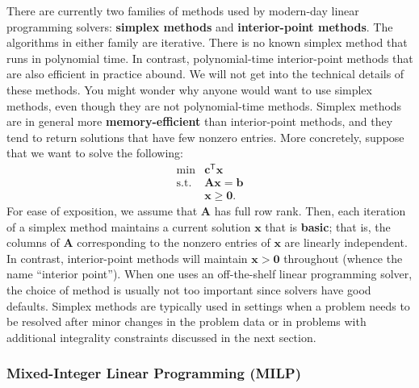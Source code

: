 There are currently two families of methods used by modern-day linear
programming solvers: \textbf{simplex methods} and \textbf{interior-point methods}. The
algorithms in either family are iterative. There is no known simplex
method that runs in polynomial time. In contrast, polynomial-time
interior-point methods that are also efficient in practice abound. We will not get into the technical details of these methods. \newl You might wonder why anyone would want to use simplex methods, even though they are not polynomial-time methods. Simplex methods are in general more \textbf{memory-efficient} than interior-point methods, and they tend to return solutions that have few nonzero entries. More
concretely, suppose that we want to solve the following:
\[\begin{array}{rl}
\min & \mathbf{c}^\mathsf{T}\mathbf{x} \\
\mbox{s.t.} & \mathbf{A}\mathbf{x} = \mathbf{b} \\
            & \mathbf{x} \geq \mathbf{0}.
\end{array}\] For ease of exposition, we assume that \(\mathbf{A}\) has
full row rank. Then, each iteration of a simplex method maintains a
current solution \(\mathbf{x}\) that is \textbf{basic}; that is, the columns of
\(\mathbf{A}\) corresponding to the nonzero entries of \(\mathbf{x}\)
are linearly independent. In contrast, interior-point methods will
maintain \(\mathbf{x} > \mathbf{0}\) throughout (whence the name
``interior point'').
\newl When one uses an off-the-shelf linear programming solver, the choice of
method is usually not too important since solvers have good defaults.
Simplex methods are typically used in settings when a problem needs to
be resolved after minor changes in the problem data or in problems with
additional integrality constraints discussed in the next section.


\subsubsection{Mixed-Integer Linear Programming
(MILP)}

